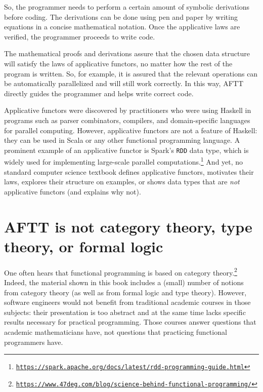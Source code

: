 So, the programmer needs to perform a certain amount of symbolic derivations
before coding. The derivations can be done using pen and paper by
writing equations in a concise mathematical notation. Once the applicative
laws are verified, the programmer proceeds to write code.

The mathematical proofs and derivations assure that the chosen data
structure will satisfy the laws of applicative functors, no matter
how the rest of the program is written. So, for example, it is assured
that the relevant operations can be automatically parallelized and
will still work correctly. In this way, AFTT directly guides the programmer
and helps write correct code.

Applicative functors were discovered by practitioners who were using
Haskell in programs such as parser combinators, compilers, and domain-specific
languages for parallel computing. However, applicative functors are
not a feature of Haskell: they can be used in Scala or any other functional
programming language. A prominent example of an applicative functor
is Spark\textsf{'}s \lstinline!RDD! data type, which is widely used for implementing
large-scale parallel computations.\footnote{\texttt{\href{https://spark.apache.org/docs/latest/rdd-programming-guide.html}{https://spark.apache.org/docs/latest/rdd-programming-guide.html}}}
And yet, no standard computer science textbook defines applicative
functors, motivates their laws, explores their structure on examples,
or shows data types that are \emph{not} applicative functors (and
explains why not). 

\section{AFTT is not category theory, type theory, or formal logic}

One often hears that functional programming is based on category theory.\footnote{\texttt{\href{https://www.47deg.com/blog/science-behind-functional-programming/}{https://www.47deg.com/blog/science-behind-functional-programming/}}}
Indeed, the material shown in this book includes a (small) number
of notions from category theory (as well as from formal logic and
type theory). However, software engineers would not benefit from traditional
academic courses in those subjects: their presentation is too abstract
and at the same time lacks specific results necessary for practical
programming. Those courses answer questions that academic mathematicians
have, not questions that practicing functional programmers have.

